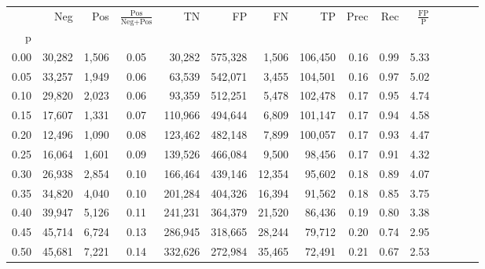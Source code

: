 \begin{tabular}{rrrcrrrrrrrrrrr}
\toprule
{} &     Neg &    Pos & $\frac{\text{Pos}}{\text{Neg}+\text{Pos}}$ &       TN &       FP &       FN &       TP &  Prec &   Rec & $\frac{\text{FP}}{\text{P}}$ \\
p    &         &        &                                            &          &          &          &          &       &       &                              \\
\midrule
0.00 &  30,282 &  1,506 &                                       0.05 &   30,282 &  575,328 &    1,506 &  106,450 &  0.16 &  0.99 &                         5.33 \\
0.05 &  33,257 &  1,949 &                                       0.06 &   63,539 &  542,071 &    3,455 &  104,501 &  0.16 &  0.97 &                         5.02 \\
0.10 &  29,820 &  2,023 &                                       0.06 &   93,359 &  512,251 &    5,478 &  102,478 &  0.17 &  0.95 &                         4.74 \\
0.15 &  17,607 &  1,331 &                                       0.07 &  110,966 &  494,644 &    6,809 &  101,147 &  0.17 &  0.94 &                         4.58 \\
0.20 &  12,496 &  1,090 &                                       0.08 &  123,462 &  482,148 &    7,899 &  100,057 &  0.17 &  0.93 &                         4.47 \\
0.25 &  16,064 &  1,601 &                                       0.09 &  139,526 &  466,084 &    9,500 &   98,456 &  0.17 &  0.91 &                         4.32 \\
0.30 &  26,938 &  2,854 &                                       0.10 &  166,464 &  439,146 &   12,354 &   95,602 &  0.18 &  0.89 &                         4.07 \\
0.35 &  34,820 &  4,040 &                                       0.10 &  201,284 &  404,326 &   16,394 &   91,562 &  0.18 &  0.85 &                         3.75 \\
0.40 &  39,947 &  5,126 &                                       0.11 &  241,231 &  364,379 &   21,520 &   86,436 &  0.19 &  0.80 &                         3.38 \\
0.45 &  45,714 &  6,724 &                                       0.13 &  286,945 &  318,665 &   28,244 &   79,712 &  0.20 &  0.74 &                         2.95 \\
0.50 &  45,681 &  7,221 &                                       0.14 &  332,626 &  272,984 &   35,465 &   72,491 &  0.21 &  0.67 &                         2.53 \\

\end{tabular}
